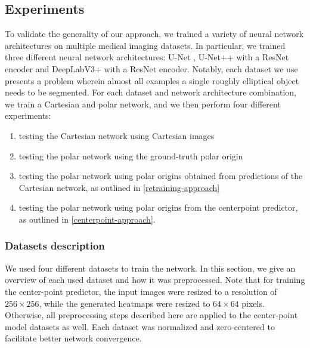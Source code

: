   \subsection{Experiments} \label{experiments}
  
To validate the generality of our approach, we trained a variety of neural network architectures on 
multiple medical imaging datasets. In particular, we trained three different neural network 
architectures: U-Net \cite{ronnebergerUNetConvolutionalNetworks2015}, U-Net++ 
\citet{zhouUNetNestedUNet2018} with a ResNet encoder and DeepLabV3+ 
\cite{chenEncoderDecoderAtrousSeparable2018} with a ResNet encoder. Notably, each dataset we use presents a problem wherein almost all examples a single roughly elliptical object needs to be segmented. 
For each dataset and network architecture combination, we train a Cartesian and polar network, and we then 
perform four different experiments: 

\begin{enumerate}
	\item{testing the Cartesian network using Cartesian images}
	\item{testing the polar network using the ground-truth polar origin}
	\item{testing the polar network using polar origins obtained from predictions of the Cartesian network, as outlined in \ref{retraining-approach}}
	\item{testing the polar network using polar origins from the centerpoint predictor, as outlined in \ref{centerpoint-approach}}.
\end{enumerate}

    \subsubsection{Datasets description}

We used four different datasets to train the network. In this section, we give an overview of each used dataset and how it was preprocessed. Note that for training the center-point predictor, the input images were resized to a resolution of $256 \times 256$, while the generated heatmaps were resized to $64 \times 64$ pixels. Otherwise, all preprocessing steps described here are applied to the center-point model datasets as well. Each dataset was normalized and zero-centered to facilitate better network convergence. 

